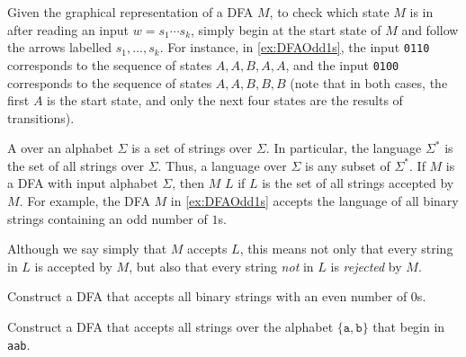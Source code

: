 Given the graphical representation of a DFA $M$, to check which state $M$ is in after reading an input $w = s_1 \cdots s_k$, simply begin at the start state of $M$ and follow the arrows labelled $s_1, \ldots, s_k$. For instance, in \cref{ex:DFAOdd1s}, the input \texttt{0110} corresponds to the sequence of states $A, A, B, A, A$, and the input \texttt{0100} corresponds to the sequence of states $A, A, B, B, B$ (note that in both cases, the first $A$ is the start state, and only the next four states are the results of transitions).

A  over an alphabet $\Sigma$ is a set of strings over $\Sigma$. In particular, the language $\Sigma^*$ is the set of all strings over $\Sigma$. Thus, a language over $\Sigma$ is any subset of $\Sigma^*$. If $M$ is a DFA with input alphabet $\Sigma$, then $M$  $L$ if $L$ is the set of all strings accepted by $M$. For example, the DFA $M$ in \cref{ex:DFAOdd1s} accepts the language of all binary strings containing an odd number of $1$s.

\begin{Note*}
Although we say simply that $M$ accepts $L$, this means not only that every string in $L$ is accepted by $M$, but also that every string \emph{not} in $L$ is \emph{rejected} by $M$.
\end{Note*}

\begin{Exercise}\label{exer:DFAEven0s}
Construct a DFA that accepts all binary strings with an even number of $0$s.
\end{Exercise}


\begin{Exercise}\label{exer:DFABeginaab}
Construct a DFA that accepts all strings over the alphabet $\{\texttt a, \texttt b\}$ that begin in \texttt{aab}.
\end{Exercise}

